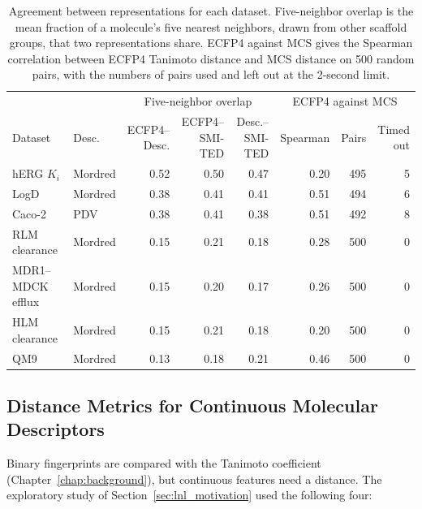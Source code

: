 \begin{table}[t]
\centering
\small
\setlength{\tabcolsep}{4pt}
\begin{adjustbox}{max width=\textwidth,max totalheight=0.78\textheight}
\begin{tabular}{llrrrrrr}
\toprule
 & & \multicolumn{3}{c}{Five-neighbor overlap} & \multicolumn{3}{c}{ECFP4 against MCS} \\
\cmidrule(lr){3-5}\cmidrule(lr){6-8}
Dataset & Desc. & \makecell{ECFP4--\\Desc.} & \makecell{ECFP4--\\SMI-TED} & \makecell{Desc.--\\SMI-TED} & Spearman & Pairs & \makecell{Timed\\out} \\
\midrule
hERG $K_i$ & Mordred & 0.52 & 0.50 & 0.47 & 0.20 & 495 & 5 \\
LogD & Mordred & 0.38 & 0.41 & 0.41 & 0.51 & 494 & 6 \\
Caco-2 & PDV & 0.38 & 0.41 & 0.38 & 0.51 & 492 & 8 \\
RLM clearance & Mordred & 0.15 & 0.21 & 0.18 & 0.28 & 500 & 0 \\
MDR1--MDCK efflux & Mordred & 0.15 & 0.20 & 0.17 & 0.26 & 500 & 0 \\
HLM clearance & Mordred & 0.15 & 0.21 & 0.18 & 0.20 & 500 & 0 \\
QM9 & Mordred & 0.13 & 0.18 & 0.21 & 0.46 & 500 & 0 \\
\bottomrule
\end{tabular}
\end{adjustbox}
\caption[Agreement between representations per dataset.]{Agreement between representations for each dataset. Five-neighbor overlap is the mean fraction of a molecule's five nearest neighbors, drawn from other scaffold groups, that two representations share. ECFP4 against MCS gives the Spearman correlation between ECFP4 Tanimoto distance and MCS distance on 500 random pairs, with the numbers of pairs used and left out at the 2-second limit.}
\label{tab:flaws:neighbor_overlap}
\end{table}


\subsection{Distance Metrics for Continuous Molecular Descriptors}

Binary fingerprints are compared with the Tanimoto coefficient (Chapter~\ref{chap:background}), but continuous features need a distance. The exploratory study of Section~\ref{sec:lnl_motivation} used the following four:

